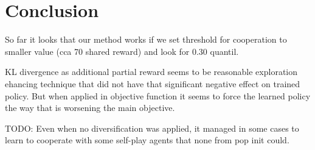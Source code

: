 \chapter*{Conclusion}
So far it looks that our method works if we set threshold for cooperation to smaller value (cca 70 shared reward) and look for 0.30 quantil.

KL divergence as additional partial reward seems to be reasonable exploration ehancing technique that did not have that significant negative effect on trained policy.
But when applied in objective function it seems to force the learned policy the way that is worsening the main objective.

TODO: Even when no diversification was applied, it managed in some cases to learn to cooperate with some self-play agents that none from pop init could.

